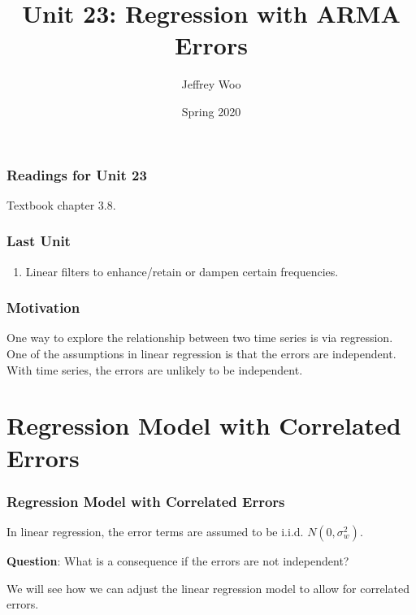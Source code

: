 \documentclass[%
xcolor=pdftex]{beamer}
\title{Unit 23: Regression with ARMA Errors}
\author[STAT 5170: Applied Time Series, Unit 25]{Jeffrey Woo}
\institute{Department of Statistics, University of Virginia}
\date{Spring 2020}
\begin{document}
\frame{\titlepage}


\begin{frame}
\frametitle{Readings for Unit 23}

Textbook chapter 3.8.

\end{frame}


\begin{frame}
\frametitle{Last Unit}
\begin{enumerate}
\item Linear filters to enhance/retain or dampen certain frequencies.
\end{enumerate}
\end{frame}

\begin{frame}
\frametitle{Motivation}

One way to explore the relationship between two time series is via regression. One of the assumptions in linear regression is that the errors are independent. With time series, the errors are unlikely to be independent.


\end{frame}

\section{Regression Model with Correlated Errors}
\frame{\tableofcontents[currentsection]}

\begin{frame}
\frametitle{Regression Model with Correlated Errors}

In linear regression, the error terms are assumed to be i.i.d. $N(0, \sigma_w^2)$.

\vspace{10mm}

\textbf{Question}: What is a consequence if the errors are not independent?

\vspace{10mm}

We will see how we can adjust the linear regression model to allow for correlated errors.

\end{frame}
\end{document}
